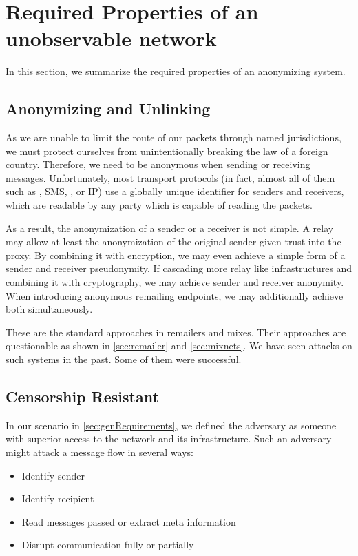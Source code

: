 \section{Required Properties of an unobservable network}
In this section, we summarize the required properties of an anonymizing system.

\subsection{Anonymizing and Unlinking}
As we are unable to limit the route of our packets through named jurisdictions, we must protect ourselves from unintentionally breaking the law of a foreign country. Therefore, we need to be anonymous when sending or receiving messages. Unfortunately, most transport protocols (in fact, almost all of them such as , SMS, , or IP) use a globally unique identifier for senders and receivers, which are readable by any party which is capable of reading the packets. 

As a result, the anonymization of a sender or a receiver is not simple. A relay may allow at least the anonymization of the original sender given trust into the proxy. By combining it with encryption, we may even achieve a simple form of a sender and receiver pseudonymity. If cascading more relay like infrastructures and combining it with cryptography, we may achieve sender and receiver anonymity. When introducing anonymous remailing endpoints, we may additionally achieve both simultaneously.

These are the standard approaches in remailers and mixes. Their approaches are questionable as shown in \ref{sec:remailer} and \ref{sec:mixnets}. We have seen attacks on such systems in the past. Some of them were successful.

\subsection{Censorship Resistant}
In our scenario in \ref{sec:genRequirements}, we defined the adversary as someone with superior access to the network and its infrastructure. Such an adversary might attack a message flow in several ways:
\begin{itemize}
	\item Identify sender
	\item Identify recipient
	\item Read messages passed or extract meta information
	\item Disrupt communication fully or partially
\end{itemize}

